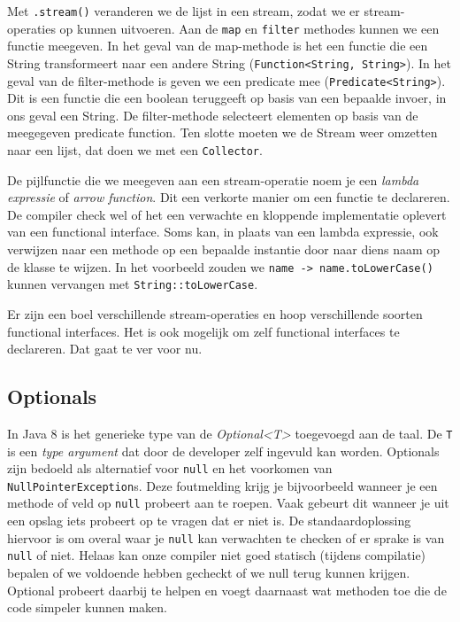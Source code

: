 Met \texttt{.stream()} veranderen we de lijst in een stream, zodat we er 
stream-operaties op kunnen uitvoeren.
Aan de \texttt{map} en \texttt{filter} methodes kunnen we een functie meegeven.
In het geval van de map-methode is het een functie die een String transformeert 
naar een andere String (\texttt{Function<String, String>}). In het geval 
van de filter-methode is geven we een predicate mee (\texttt{Predicate<String>}). 
Dit is een functie die een boolean teruggeeft op basis van een bepaalde invoer, in ons geval een String.
De filter-methode selecteert elementen op basis van de meegegeven predicate function.
Ten slotte moeten we de Stream weer omzetten naar een lijst, dat doen we met een \texttt{Collector}.

De pijlfunctie die we meegeven aan een stream-operatie noem je een \textit{lambda expressie} of \textit{arrow function}.
Dit een verkorte manier om een functie te declareren. De compiler check wel of het een verwachte en kloppende
implementatie oplevert van een functional interface.
Soms kan, in plaats van een lambda expressie, ook verwijzen naar een methode op een bepaalde instantie door naar diens naam 
op de klasse te wijzen. In het voorbeeld zouden we \texttt{name -> name.toLowerCase()} kunnen vervangen 
met \texttt{String::toLowerCase}.

Er zijn een boel verschillende stream-operaties en hoop verschillende soorten functional interfaces.
Het is ook mogelijk om zelf functional interfaces te declareren. Dat gaat te ver voor nu.

\subsection{Optionals}
In Java 8 is het generieke type van de \textit{Optional<T>} toegevoegd aan de taal.
De \texttt{T} is een \textit{type argument} dat door de developer zelf ingevuld kan worden.
Optionals zijn bedoeld als alternatief voor \texttt{null} en het voorkomen van 
\texttt{NullPointerException}s. Deze foutmelding krijg je bijvoorbeeld wanneer 
je een methode of veld op \texttt{null} probeert aan te roepen. Vaak gebeurt dit 
wanneer je uit een opslag iets probeert op te vragen dat er niet is. De standaardoplossing
hiervoor is om overal waar je \texttt{null} kan verwachten te checken of 
er sprake is van \texttt{null} of niet. Helaas kan onze compiler niet goed statisch (tijdens compilatie)
bepalen of we voldoende hebben gecheckt of we null terug kunnen krijgen.
Optional probeert daarbij te helpen en voegt daarnaast
wat methoden toe die de code simpeler kunnen maken.

